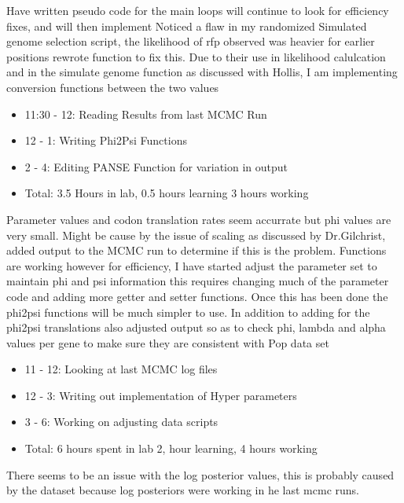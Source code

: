 \documentclass[12pt,hyperref]{labbook}
\begin{document}
Have written pseudo code for the main loops will continue to look for efficiency fixes, and will then implement
Noticed a flaw in my randomized Simulated genome selection script, the likelihood of rfp observed was heavier for earlier positions rewrote function to fix this.
Due to their use in likelihood calulcation and in the simulate genome function as discussed with Hollis, I am implementing conversion functions between the two values
\begin{itemize}
    \item 11:30 - 12: Reading Results from last MCMC Run
    \item 12 - 1: Writing Phi2Psi Functions
    \item 2 - 4: Editing PANSE Function for variation in output
    \item Total: 3.5 Hours in lab, 0.5 hours learning 3 hours working
\end{itemize}
Parameter values and codon translation rates seem accurrate but phi values are very small. Might be cause by the issue of scaling as discussed by Dr.Gilchrist, added output to the MCMC run to determine if this is the problem. 
Functions are working however for efficiency, I have started adjust the parameter set to maintain phi and psi information this requires changing much of the parameter code and adding more getter and setter functions. Once this has been done the phi2psi functions will be much simpler to use.
In addition to adding for the phi2psi translations also adjusted output so as to check phi, lambda and alpha values per gene to make sure they are consistent with Pop data set
\begin{itemize}
    \item 11 - 12: Looking at last MCMC log files
    \item 12 - 3: Writing out implementation of Hyper parameters
    \item 3 - 6: Working on adjusting data scripts
    \item Total: 6 hours spent in lab 2, hour learning, 4 hours working
\end{itemize}
There seems to be an issue with the log posterior values, this is probably caused by the dataset because log posteriors were working in he last mcmc runs. 
\end{document}
